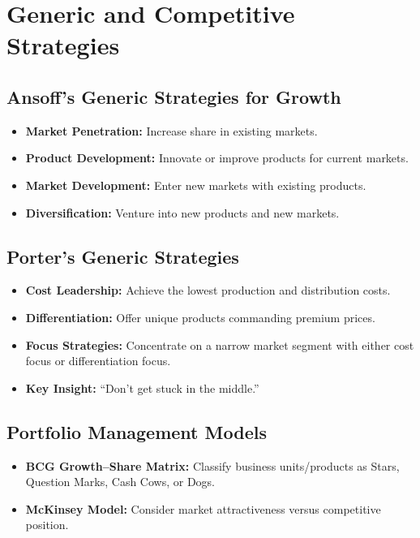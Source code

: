 \documentclass[12pt,a4paper]{report}
\begin{document}
\section{Generic and Competitive Strategies}
\subsection{Ansoff’s Generic Strategies for Growth}
\begin{itemize}
    \item \textbf{Market Penetration:} Increase share in existing markets.
    \item \textbf{Product Development:} Innovate or improve products for current markets.
    \item \textbf{Market Development:} Enter new markets with existing products.
    \item \textbf{Diversification:} Venture into new products and new markets.
\end{itemize}

\subsection{Porter’s Generic Strategies}
\begin{itemize}
    \item \textbf{Cost Leadership:} Achieve the lowest production and distribution costs.
    \item \textbf{Differentiation:} Offer unique products commanding premium prices.
    \item \textbf{Focus Strategies:} Concentrate on a narrow market segment with either cost focus or differentiation focus.
    \item \textbf{Key Insight:} “Don’t get stuck in the middle.”
\end{itemize}

\subsection{Portfolio Management Models}
\begin{itemize}
    \item \textbf{BCG Growth--Share Matrix:} Classify business units/products as Stars, Question Marks, Cash Cows, or Dogs.
    \item \textbf{McKinsey Model:} Consider market attractiveness versus competitive position.
\end{itemize}
\end{document}
